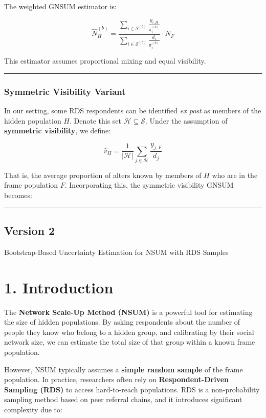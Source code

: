 \documentclass[
  12pt,
  letterpaper,
  DIV=11,
  numbers=noendperiod]{scrartcl}
\theoremstyle{plain}
\theoremstyle{definition}
\begin{document}
The weighted GNSUM estimator is:

\[
\hat{N}_H^{(b)} = \frac{\sum_{i \in \mathcal{S}^{(b)}} \frac{y_{i,H}}{\pi_i^{(b)}}}{\sum_{i \in \mathcal{S}^{(b)}} \frac{d_i}{\pi_i^{(b)}}} \cdot N_F
\]

This estimator assumes proportional mixing and equal visibility.

\begin{center}\rule{0.5\linewidth}{0.5pt}\end{center}

\subsubsection{Symmetric Visibility
Variant}\label{symmetric-visibility-variant}

In our setting, some RDS respondents can be identified \emph{ex post} as
members of the hidden population \(H\). Denote this set
\(\mathcal{H} \subseteq \mathcal{S}\). Under the assumption of
\textbf{symmetric visibility}, we define:

\[
\hat{v}_{H} = \frac{1}{|\mathcal{H}|} \sum_{j \in \mathcal{H}} \frac{y_{j,F}}{d_j}
\]

That is, the average proportion of alters known by members of \(H\) who
are in the frame population \(F\). Incorporating this, the symmetric
visibility GNSUM becomes:

\begin{center}\rule{0.5\linewidth}{0.5pt}\end{center}

\subsection{Version 2}\label{version-2}

Bootstrap-Based Uncertainty Estimation for NSUM with RDS Samples

\section{1. Introduction}\label{introduction-2}

The \textbf{Network Scale-Up Method (NSUM)} is a powerful tool for
estimating the size of hidden populations. By asking respondents about
the number of people they know who belong to a hidden group, and
calibrating by their social network size, we can estimate the total size
of that group within a known frame population.

However, NSUM typically assumes a \textbf{simple random sample} of the
frame population. In practice, researchers often rely on
\textbf{Respondent-Driven Sampling (RDS)} to access hard-to-reach
populations. RDS is a non-probability sampling method based on peer
referral chains, and it introduces significant complexity due to:
\end{document}
